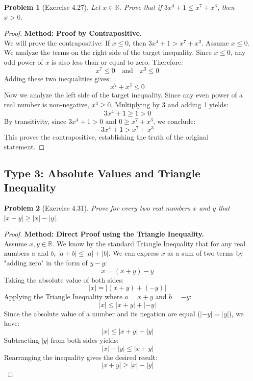 \documentclass[11pt]{article}
\newtheorem{problem}{Problem}
\newcommand{\R}{\mathbb{R}}
\newcommand{\abs}[1]{\left|#1\right|}
\begin{document}
\begin{problem}[Exercise 4.27]
Let $x \in \R$. Prove that if $3x^4 + 1 \le x^7 + x^3$, then $x > 0$.
\end{problem}
\begin{proof}
\textbf{Method: Proof by Contrapositive.} \\
We will prove the contrapositive: If $x \le 0$, then $3x^4 + 1 > x^7 + x^3$.
Assume $x \le 0$. We analyze the terms on the right side of the target inequality.
Since $x \le 0$, any odd power of $x$ is also less than or equal to zero. Therefore:
\[ x^7 \le 0 \quad \text{and} \quad x^3 \le 0 \]
Adding these two inequalities gives:
\[ x^7 + x^3 \le 0 \]
Now we analyze the left side of the target inequality. Since any even power of a real number is non-negative, $x^4 \ge 0$. Multiplying by 3 and adding 1 yields:
\[ 3x^4 + 1 \ge 1 > 0 \]
By transitivity, since $3x^4 + 1 > 0$ and $0 \ge x^7 + x^3$, we conclude:
\[ 3x^4 + 1 > x^7 + x^3 \]
This proves the contrapositive, establishing the truth of the original statement.
\end{proof}

\subsection{Type 3: Absolute Values and Triangle Inequality}

\begin{problem}[Exercise 4.31]
Prove for every two real numbers $x$ and $y$ that $\abs{x + y} \ge \abs{x} - \abs{y}$.
\end{problem}
\begin{proof}
\textbf{Method: Direct Proof using the Triangle Inequality.} \\
Assume $x, y \in \R$. We know by the standard Triangle Inequality that for any real numbers $a$ and $b$, $\abs{a + b} \le \abs{a} + \abs{b}$.
We can express $x$ as a sum of two terms by "adding zero" in the form of $y - y$:
\[ x = (x + y) - y \]
Taking the absolute value of both sides:
\[ \abs{x} = \abs{(x + y) + (-y)} \]
Applying the Triangle Inequality where $a = x + y$ and $b = -y$:
\[ \abs{x} \le \abs{x + y} + \abs{-y} \]
Since the absolute value of a number and its negation are equal ($\abs{-y} = \abs{y}$), we have:
\[ \abs{x} \le \abs{x + y} + \abs{y} \]
Subtracting $\abs{y}$ from both sides yields:
\[ \abs{x} - \abs{y} \le \abs{x + y} \]
Rearranging the inequality gives the desired result:
\[ \abs{x + y} \ge \abs{x} - \abs{y} \]
\end{proof}
\end{document}
